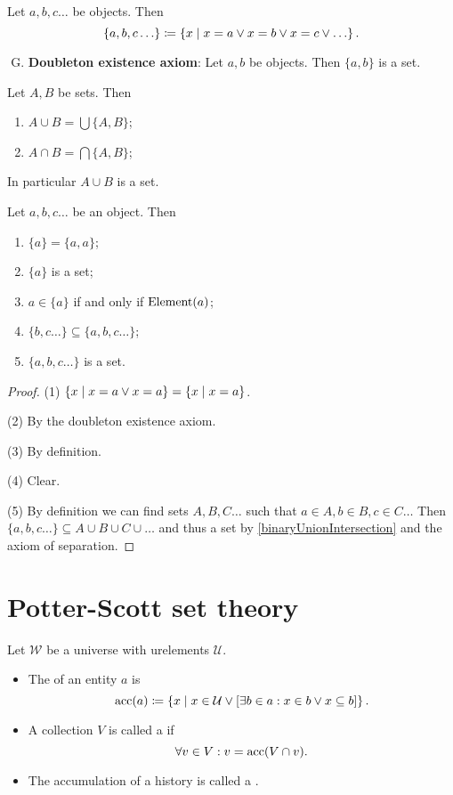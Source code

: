 \begin{definition}
Let $a,b, c \ldots$ be objects. Then
\[ \{a,b, c \ldots\} \coloneqq \left\{ x \;\middle|\; x = a \lor x = b \lor x = c \lor \ldots \right\}. \]
\end{definition}

\begin{enumerate}[(A)] \setcounter{enumi}{6}
\item \textbf{Doubleton existence axiom}: Let $a,b$ be objects. Then $\{a,b\}$ is a set.
\end{enumerate}

\begin{lemma} \label{binaryUnionIntersection}
Let $A,B$ be sets. Then
\begin{enumerate}
\item $A \cup B = \bigcup\{A, B\}$;
\item $A \cap B = \bigcap\{A, B\}$;
\end{enumerate}
In particular $A\cup B$ is a set.
\end{lemma}

\begin{lemma}
Let $a,b, c \ldots$ be an object. Then
\begin{enumerate}
\item $\{a\} = \{a, a\}$;
\item $\{a\}$ is a set;
\item $a\in \{a\}$ \textup{if and only if} $\operatorname{Element}(a)$;
\item $\{b,c \ldots\} \subseteq \{a,b,c \ldots\}$;
\item $\{a,b, c \ldots\}$ is a set.
\end{enumerate}
\end{lemma}
\begin{proof}
(1) $\left\{ x \;\middle|\; x = a \lor x = a \right\} = \left\{ x \;\middle|\; x = a \right\}$.

(2) By the doubleton existence axiom.

(3) By definition.

(4) Clear.

(5) By definition we can find sets $A,B,C \ldots$ such that $a\in A, b\in B, c\in C \ldots$ Then $\{a,b, c \ldots\} \subseteq A\cup B\cup C \cup \ldots$ and thus a set by \ref{binaryUnionIntersection} and the axiom of separation.
\end{proof}


\section{Potter-Scott set theory}
\begin{definition}
Let $\mathcal{W}$ be a universe with urelements $\mathcal{U}$.
\begin{itemize}
\item The  of an entity $a$ is
\[ \operatorname{acc}(a) \coloneqq \left\{ x \;\middle|\; x\in \mathcal{U} \lor \left[\exists b\in a: x\in b \lor x\subseteq b\right] \right\}. \]
\item A collection $V$ is called a  if
\[ \forall v\in V: v = \operatorname{acc}(V\cap v). \]
\item The accumulation of a history is called a .
\end{itemize}
\end{definition}

